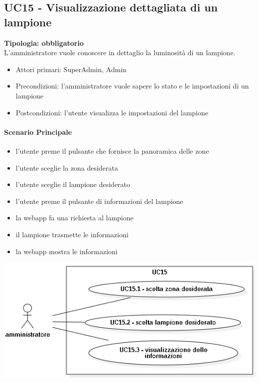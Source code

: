 \documentclass[12pt]{article}
\begin{document}
\subsection{UC15 - Visualizzazione dettagliata di un lampione}
\textbf{Tipologia: obbligatorio} \\
L'amministratore vuole conoscere in dettaglio la luminosità di un lampione.
\begin{itemize}
	\item Attori primari: SuperAdmin, Admin
	\item Precondizioni: l'amministratore vuole sapere lo stato e le impostazioni di un lampione
	\item Postcondizioni: l'utente visualizza le impostazioni del lampione
\end{itemize}
\paragraph{Scenario Principale}
\begin{itemize}
	\item l'utente preme il pulsante che fornisce la panoramica delle zone
	\item l'utente sceglie la zona desiderata
	\item l'utente sceglie il lampione desiderato
	\item l'utente preme il pulsante di informazioni del lampione
	\item la webapp fa una richiesta al lampione
	\item il lampione trasmette le informazioni
	\item la webapp mostra le informazioni
\end{itemize}

\includegraphics[scale=0.5]{UC15.png}
\end{document}
